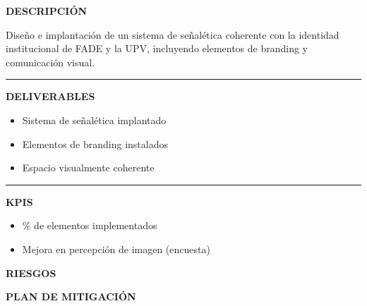 \documentclass[11pt,a4paper]{scrreprt}
\newcommand{\fieldlabel}[1]{%
  {\footnotesize\sffamily\bfseries\color{mutedcolor}\MakeUppercase{#1}}\par\nopagebreak[4]
}
\newcommand{\fieldsep}{\vspace{3pt}\noindent\textcolor{bordercolor}{\rule{\linewidth}{0.4pt}}\vspace{3pt}\par}
\begin{document}
\begin{tcolorbox}[pabox={espcolor}{PA3.1 \enspace\textbullet\enspace Implementación de identidad y señalética}]

\fieldlabel{Descripci\'on}
{\small Diseño e implantación de un sistema de señalética coherente con la identidad institucional de FADE y la UPV, incluyendo elementos de branding y comunicación visual.}\par
\fieldsep
\fieldlabel{Deliverables}
{\small \begin{itemize}[noitemsep,topsep=2pt]
\item Sistema de señalética implantado
\item Elementos de branding instalados
\item Espacio visualmente coherente
\end{itemize}}\par
\fieldsep
\fieldlabel{KPIs}
{\small \begin{itemize}[noitemsep,topsep=2pt]
\item \% de elementos implementados
\item Mejora en percepción de imagen (encuesta)
\end{itemize}}\par
\end{tcolorbox}
\begin{tcolorbox}[riskbox]
{\footnotesize\sffamily\bfseries\color{red!50!black} RIESGOS}\par{}
\end{tcolorbox}
\begin{tcolorbox}[mitbox]
{\footnotesize\sffamily\bfseries\color{green!40!black} PLAN DE MITIGACI\'ON}\par{}
\end{tcolorbox}
\vspace{8pt}
\end{document}
